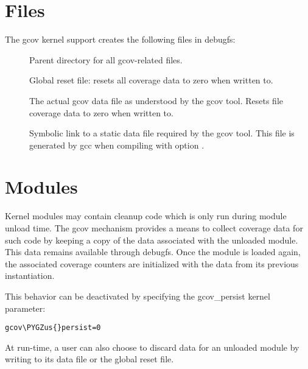 \documentclass[a4paper,8pt,english]{sphinxmanual}
\def\PYGZus{\char`\_}
\begin{document}
\section{Files}
\label{dev-tools/gcov:files}
The gcov kernel support creates the following files in debugfs:
\begin{description}
\item[{}] \leavevmode
Parent directory for all gcov-related files.

\item[{}] \leavevmode
Global reset file: resets all coverage data to zero when
written to.

\item[{}] \leavevmode
The actual gcov data file as understood by the gcov
tool. Resets file coverage data to zero when written to.

\item[{}] \leavevmode
Symbolic link to a static data file required by the gcov
tool. This file is generated by gcc when compiling with
option .

\end{description}


\section{Modules}
\label{dev-tools/gcov:modules}
Kernel modules may contain cleanup code which is only run during
module unload time. The gcov mechanism provides a means to collect
coverage data for such code by keeping a copy of the data associated
with the unloaded module. This data remains available through debugfs.
Once the module is loaded again, the associated coverage counters are
initialized with the data from its previous instantiation.

This behavior can be deactivated by specifying the gcov\_persist kernel
parameter:

\begin{Verbatim}[commandchars=\\\{\}]
gcov\PYGZus{}persist=0
\end{Verbatim}

At run-time, a user can also choose to discard data for an unloaded
module by writing to its data file or the global reset file.
\end{document}
